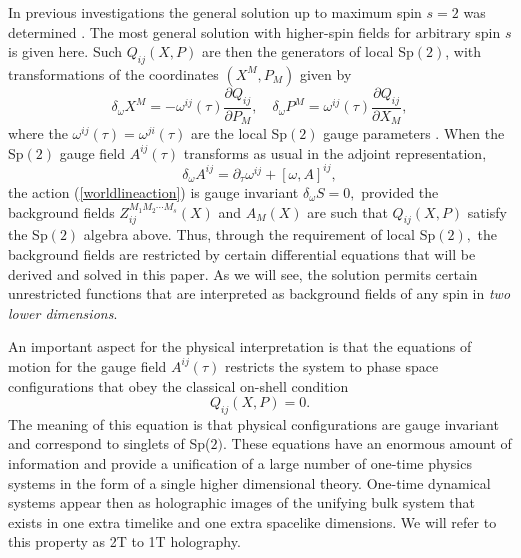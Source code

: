 \documentclass[a4paper,12pt]{article}
\begin{document}
In previous investigations the general solution up to maximum spin $s=2$ was
determined \cite{emgrav}. The most general solution with higher-spin fields
for arbitrary spin $s$ is given here. Such $Q_{ij}\left( X,P\right) $ are
then the generators of local Sp$\left( 2\right) $, with transformations of
the coordinates $\left( X^{M},P_{M}\right) $ given by
\begin{equation}
\delta _{\omega }X^{M}=-\omega ^{ij}\left( \tau \right) \frac{\partial Q_{ij}%
}{\partial P_{M}},\quad \delta _{\omega }P^{M}=\omega ^{ij}\left( \tau
\right) \frac{\partial Q_{ij}}{\partial X_{M}},  \label{spgauge1}
\end{equation}
where the $\omega ^{ij}\left( \tau \right) =\omega ^{ji}\left( \tau \right) $
are the local Sp$\left( 2\right) $ gauge parameters \cite{emgrav}. When the
Sp$\left( 2\right) $ gauge field $A^{ij}\left( \tau \right) $ transforms as
usual in the adjoint representation,
\begin{equation}
\delta _{\omega }A^{ij}=\partial _{\tau }\omega ^{ij}+\left[ \omega ,A\right]
^{ij},  \label{spgauge2}
\end{equation}
the action (\ref{worldlineaction}) is gauge invariant $\delta _{\omega }S=0,$
provided the background fields $Z_{ij}^{M_{1}M_{2}\cdots M_{s}}\left(
X\right) $ and $A_{M}\left( X\right) $ are such that $Q_{ij}\left(
X,P\right) $ satisfy the Sp$\left( 2\right) $ algebra above. Thus, through
the requirement of local Sp$\left( 2\right) ,$ the background fields are
restricted by certain differential equations that will be derived and solved
in this paper. As we will see, the solution permits certain unrestricted
functions that are interpreted as background fields of any spin in \textit{%
two lower dimensions}.

An important aspect for the physical interpretation is that the equations of
motion for the gauge field $A^{ij}\left( \tau \right) $ restricts the system
to phase space configurations that obey the classical on-shell condition
\begin{equation}
Q_{ij}\left( X,P\right) =0.  \label{singlet}
\end{equation}
The meaning of this equation is that physical configurations are gauge
invariant and correspond to singlets of Sp($2).$ These equations have an
enormous amount of information and provide a unification of a large number
of one-time physics systems in the form of a single higher dimensional
theory. One-time dynamical systems appear then as holographic images of the
unifying bulk system that exists in one extra timelike and one extra
spacelike dimensions. We will refer to this property as 2T to 1T holography.
\end{document}
